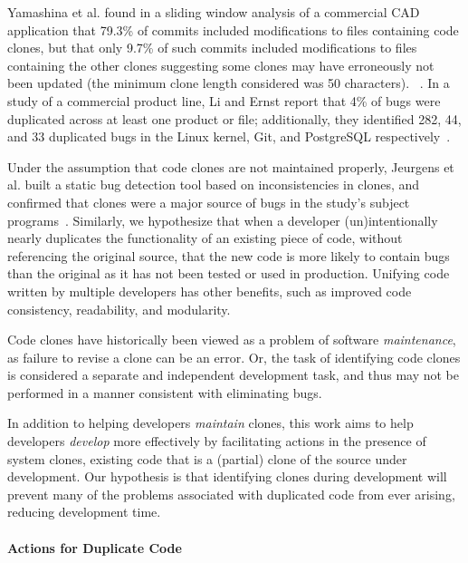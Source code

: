 \documentclass[nocopyrightspace,10pt]{sigplanconf}
\begin{document}
Yamashina et al. found in a sliding window analysis of a commercial CAD
application that 79.3\% of commits included modifications to files
containing code clones, but that only 9.7\% of such commits included
modifications to files containing the other
clones suggesting some clones may have erroneously not been updated
(the minimum clone length considered was 50 characters).
~\cite{Yamashina2008}. 
In a study of a commercial product line, Li and Ernst report that 4\%
of bugs were duplicated across at least one product or file;
additionally, they identified 282, 44, and 33 duplicated bugs in the
Linux kernel, Git, and PostgreSQL respectively~\cite{LiE2011}.


Under the assumption that code clones are not maintained properly,
Jeurgens et al. built a static bug detection tool based on
inconsistencies in clones, and confirmed that clones were a major
source of bugs in the study's subject programs~\cite{Juergens2009}.
Similarly, we hypothesize that when a developer (un)intentionally
nearly duplicates the functionality of an existing piece of code, without
referencing the original source, that the new code is more likely to
contain bugs than the original as it has not been tested or used in
production. Unifying code written by multiple developers has other 
benefits, such as improved code consistency, readability, and modularity.

Code clones have historically been viewed as a problem of software
\emph{maintenance}, as failure to revise a clone can be an error. 
Or, the task of identifying code clones is considered a separate and
independent development task, and thus may not be performed in a
manner consistent with eliminating bugs.

In addition to helping developers \emph{maintain} clones, this work
aims to help developers \emph{develop} more effectively by
facilitating actions in the presence of system clones, existing code
that is a (partial) clone of the source under development.  Our hypothesis
 is that identifying clones during development will prevent many of the problems
associated with duplicated code from ever arising, reducing development time.

\paragraph{Actions for Duplicate Code}
\end{document}
